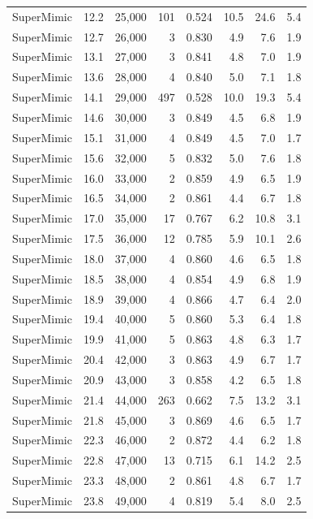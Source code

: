 \begin{tabular}{lrrrrrrr}
SuperMimic & 12.2 & 25,000 & 101 & 0.524 & 10.5 & 24.6 & 5.4 \\
SuperMimic & 12.7 & 26,000 & 3 & 0.830 & 4.9 & 7.6 & 1.9 \\
SuperMimic & 13.1 & 27,000 & 3 & 0.841 & 4.8 & 7.0 & 1.9 \\
SuperMimic & 13.6 & 28,000 & 4 & 0.840 & 5.0 & 7.1 & 1.8 \\
SuperMimic & 14.1 & 29,000 & 497 & 0.528 & 10.0 & 19.3 & 5.4 \\
SuperMimic & 14.6 & 30,000 & 3 & 0.849 & 4.5 & 6.8 & 1.9 \\
SuperMimic & 15.1 & 31,000 & 4 & 0.849 & 4.5 & 7.0 & 1.7 \\
SuperMimic & 15.6 & 32,000 & 5 & 0.832 & 5.0 & 7.6 & 1.8 \\
SuperMimic & 16.0 & 33,000 & 2 & 0.859 & 4.9 & 6.5 & 1.9 \\
SuperMimic & 16.5 & 34,000 & 2 & 0.861 & 4.4 & 6.7 & 1.8 \\
SuperMimic & 17.0 & 35,000 & 17 & 0.767 & 6.2 & 10.8 & 3.1 \\
SuperMimic & 17.5 & 36,000 & 12 & 0.785 & 5.9 & 10.1 & 2.6 \\
SuperMimic & 18.0 & 37,000 & 4 & 0.860 & 4.6 & 6.5 & 1.8 \\
SuperMimic & 18.5 & 38,000 & 4 & 0.854 & 4.9 & 6.8 & 1.9 \\
SuperMimic & 18.9 & 39,000 & 4 & 0.866 & 4.7 & 6.4 & 2.0 \\
SuperMimic & 19.4 & 40,000 & 5 & 0.860 & 5.3 & 6.4 & 1.8 \\
SuperMimic & 19.9 & 41,000 & 5 & 0.863 & 4.8 & 6.3 & 1.7 \\
SuperMimic & 20.4 & 42,000 & 3 & 0.863 & 4.9 & 6.7 & 1.7 \\
SuperMimic & 20.9 & 43,000 & 3 & 0.858 & 4.2 & 6.5 & 1.8 \\
SuperMimic & 21.4 & 44,000 & 263 & 0.662 & 7.5 & 13.2 & 3.1 \\
SuperMimic & 21.8 & 45,000 & 3 & 0.869 & 4.6 & 6.5 & 1.7 \\
SuperMimic & 22.3 & 46,000 & 2 & 0.872 & 4.4 & 6.2 & 1.8 \\
SuperMimic & 22.8 & 47,000 & 13 & 0.715 & 6.1 & 14.2 & 2.5 \\
SuperMimic & 23.3 & 48,000 & 2 & 0.861 & 4.8 & 6.7 & 1.7 \\
SuperMimic & 23.8 & 49,000 & 4 & 0.819 & 5.4 & 8.0 & 2.5 \\
\bottomrule\end{tabular}
